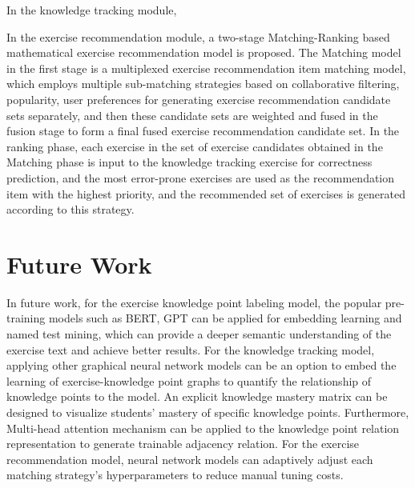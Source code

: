 
In the knowledge tracking module,


In the exercise recommendation module, a two-stage Matching-Ranking based mathematical exercise recommendation model is proposed. The Matching model in the first stage is a multiplexed exercise recommendation item matching model, which employs multiple sub-matching strategies based on collaborative filtering, popularity, user preferences for generating exercise recommendation candidate sets separately, and then these candidate sets are weighted and fused in the fusion stage to form a final fused exercise recommendation candidate set. In the ranking phase, each exercise in the set of exercise candidates obtained in the Matching phase is input to the knowledge tracking exercise for correctness prediction, and the most error-prone exercises are used as the recommendation item with the highest priority, and the recommended set of exercises is generated according to this strategy.


\section{Future Work}
In future work, for the exercise knowledge point labeling model, the popular pre-training models such as BERT, GPT can be applied for embedding learning and named test mining, which can provide a deeper semantic understanding of the exercise text and achieve better results. For the knowledge tracking model, applying other graphical neural network models can be an option to embed the learning of exercise-knowledge point graphs to quantify the relationship of knowledge points to the model. An explicit knowledge mastery matrix can be designed to visualize students' mastery of specific knowledge points. Furthermore, Multi-head attention mechanism can be applied to the knowledge point relation representation to generate trainable adjacency relation. For the exercise recommendation model, neural network models can adaptively adjust each matching strategy's hyperparameters to reduce manual tuning costs.